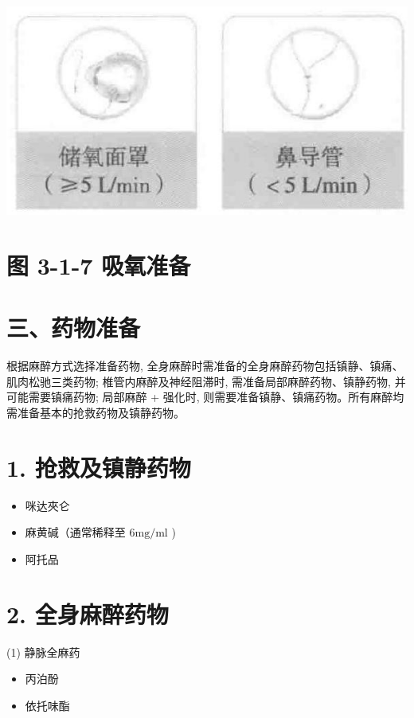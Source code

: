 \documentclass[10pt]{article}
\begin{document}
\begin{center}
\includegraphics[max width=\textwidth]{2024_07_05_645bb794a4d4f32ee0c8g-075}
\end{center}

\section*{图 3-1-7 吸氧准备}
\section*{三、药物准备}
根据麻醉方式选择准备药物, 全身麻醉时需准备的全身麻醉药物包括镇静、镇痛、肌肉松驰三类药物; 椎管内麻醉及神经阻滞时, 需准备局部麻醉药物、镇静药物, 并可能需要镇痛药物; 局部麻醉 + 强化时, 则需要准备镇静、镇痛药物。所有麻醉均需准备基本的抢救药物及镇静药物。

\section*{1. 抢救及镇静药物}
\begin{itemize}
  \item 咪达夾仑
  \item 麻黄碱（通常稀释至 $6 \mathrm{mg} / \mathrm{ml}$ )
  \item 阿托品
\end{itemize}

\section*{2. 全身麻醉药物}
(1) 静脉全麻药

\begin{itemize}
  \item 丙泊酚
  \item 依托味酯
\end{itemize}
\end{document}

